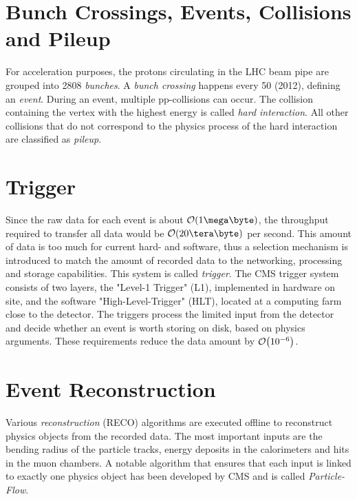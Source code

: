 \section{Bunch Crossings, Events, Collisions and Pileup}
For acceleration purposes, the protons circulating in the LHC beam pipe are grouped into 2808 \emph{bunches}\cite[p.4]{EB2008LHC}. A \emph{bunch crossing} happens every \unit{50}{\nano\second} (2012), defining an \emph{event}. During an event, multiple pp-collisions can occur. The collision containing the vertex with the highest energy is called \emph{hard interaction}. All other collisions that do not correspond to the physics process of the hard interaction are classified as \emph{pileup}.

\section{Trigger}
Since the raw data for each event is about $\order{\unit{1}{\mega\byte}}$, the throughput required to transfer all data would be $\order{\unit{20}{\tera\byte}}$ per second. This amount of data is too much for current hard- and software, thus a selection mechanism is introduced to match the amount of recorded data to the networking, processing and storage capabilities. This system is called \emph{trigger}. The CMS trigger system consists of two layers, the "Level-1 Trigger" (L1), implemented in hardware on site, and the software "High-Level-Trigger" (HLT), located at a computing farm close to the detector. The triggers process the limited input from the detector and decide whether an event is worth storing on disk, based on physics arguments. These requirements reduce the data amount by $\order{10^{-6}}$.

\section{Event Reconstruction}
Various \emph{reconstruction} (RECO) algorithms are executed offline to reconstruct physics objects from the recorded data. The most important inputs are the bending radius of the particle tracks, energy deposits in the calorimeters and hits in the muon chambers. 
A notable algorithm that ensures that each input is linked to exactly one physics object has been developed by CMS and is called \emph{Particle-Flow}\cite{2009Particle}. 
